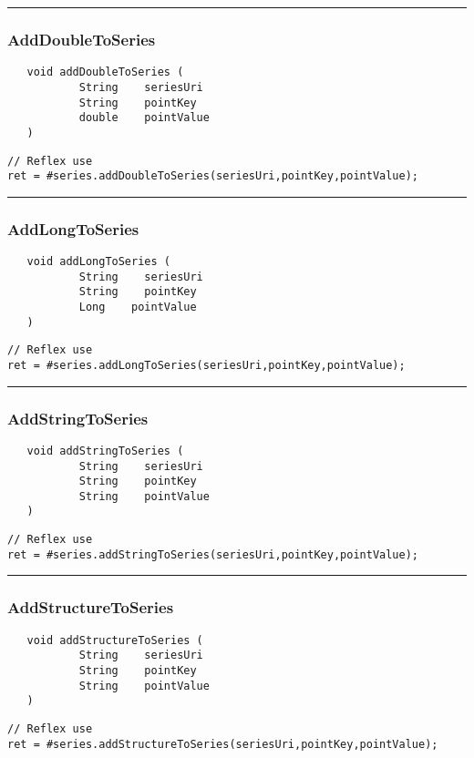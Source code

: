 \rule{15cm}{2pt}
\subsubsection{AddDoubleToSeries}
\label{Api:AddDoubleToSeries}
\begin{verbatim}
   void addDoubleToSeries (
           String    seriesUri
           String    pointKey
           double    pointValue
   )
\end{verbatim}
\begin{lstlisting}[language=reflex]
// Reflex use
ret = #series.addDoubleToSeries(seriesUri,pointKey,pointValue);
\end{lstlisting}



\rule{15cm}{2pt}
\subsubsection{AddLongToSeries}
\label{Api:AddLongToSeries}
\begin{verbatim}
   void addLongToSeries (
           String    seriesUri
           String    pointKey
           Long    pointValue
   )
\end{verbatim}
\begin{lstlisting}[language=reflex]
// Reflex use
ret = #series.addLongToSeries(seriesUri,pointKey,pointValue);
\end{lstlisting}



\rule{15cm}{2pt}
\subsubsection{AddStringToSeries}
\label{Api:AddStringToSeries}
\begin{verbatim}
   void addStringToSeries (
           String    seriesUri
           String    pointKey
           String    pointValue
   )
\end{verbatim}
\begin{lstlisting}[language=reflex]
// Reflex use
ret = #series.addStringToSeries(seriesUri,pointKey,pointValue);
\end{lstlisting}



\rule{15cm}{2pt}
\subsubsection{AddStructureToSeries}
\label{Api:AddStructureToSeries}
\begin{verbatim}
   void addStructureToSeries (
           String    seriesUri
           String    pointKey
           String    pointValue
   )
\end{verbatim}
\begin{lstlisting}[language=reflex]
// Reflex use
ret = #series.addStructureToSeries(seriesUri,pointKey,pointValue);
\end{lstlisting}



